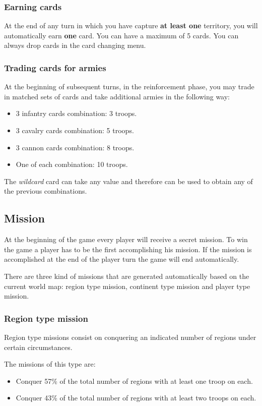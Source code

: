 \documentclass[12pt,a4paper]{article}
\begin{document}
\subsubsection{Earning cards}
At the end of any turn in which you have capture {\bf at least one}
territory, you will automatically earn {\bf one} card. You can have a
maximum of 5 cards. You can always drop cards in the card changing menu.

\subsubsection{Trading cards for armies}
At the beginning of subsequent turns, in the reinforcement phase, you
may trade in matched sets of cards and take additional armies in the
following way:
 
\begin{itemize}
\item 3 infantry cards combination: 3 troops.
\item 3 cavalry cards combination: 5 troops.
\item 3 cannon cards combination: 8 troops.
\item One of each combination: 10 troops.
\end{itemize}

The \emph{wildcard} card can take any value and therefore can be used
to obtain any of the previous combinations.

\subsection{Mission}
At the beginning of the game every player will receive a secret mission. To win the game a player has to be the first accomplishing his mission. If the mission is accomplished at the end of the player turn the game will end automatically.

There are three kind of missions that are generated automatically based on the current world map: region type mission, continent type mission and player type mission.

\subsubsection{Region type mission}
Region type missions consist on conquering an indicated number of regions under certain circumstances.

The missions of this type are:

\begin{itemize}
\item Conquer 57\% of the total number of regions with at least one troop on each.
\item Conquer 43\% of the total number of regions with at least two troops on each.
\end{itemize}
\end{document}
